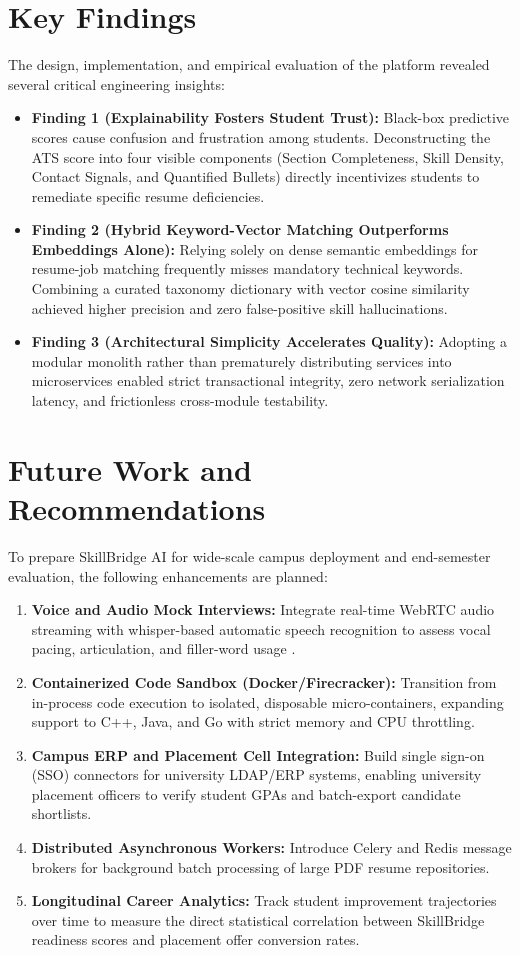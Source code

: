 \documentclass[12pt,a4paper,oneside]{report}
\begin{document}
\section{Key Findings}
The design, implementation, and empirical evaluation of the platform revealed several critical engineering insights:
\begin{itemize}[leftmargin=0.8cm]
    \item \textbf{Finding 1 (Explainability Fosters Student Trust):} Black-box predictive scores cause confusion and frustration among students. Deconstructing the ATS score into four visible components (Section Completeness, Skill Density, Contact Signals, and Quantified Bullets) directly incentivizes students to remediate specific resume deficiencies.
    \item \textbf{Finding 2 (Hybrid Keyword-Vector Matching Outperforms Embeddings Alone):} Relying solely on dense semantic embeddings for resume-job matching frequently misses mandatory technical keywords. Combining a curated taxonomy dictionary with vector cosine similarity achieved higher precision and zero false-positive skill hallucinations.
    \item \textbf{Finding 3 (Architectural Simplicity Accelerates Quality):} Adopting a modular monolith rather than prematurely distributing services into microservices enabled strict transactional integrity, zero network serialization latency, and frictionless cross-module testability.
\end{itemize}

\section{Future Work and Recommendations}
To prepare SkillBridge AI for wide-scale campus deployment and end-semester evaluation, the following enhancements are planned:
\begin{enumerate}[leftmargin=0.8cm]
    \item \textbf{Voice and Audio Mock Interviews:} Integrate real-time WebRTC audio streaming with whisper-based automatic speech recognition to assess vocal pacing, articulation, and filler-word usage \cite{texbook}.
    \item \textbf{Containerized Code Sandbox (Docker/Firecracker):} Transition from in-process code execution to isolated, disposable micro-containers, expanding support to C++, Java, and Go with strict memory and CPU throttling.
    \item \textbf{Campus ERP and Placement Cell Integration:} Build single sign-on (SSO) connectors for university LDAP/ERP systems, enabling university placement officers to verify student GPAs and batch-export candidate shortlists.
    \item \textbf{Distributed Asynchronous Workers:} Introduce Celery and Redis message brokers for background batch processing of large PDF resume repositories.
    \item \textbf{Longitudinal Career Analytics:} Track student improvement trajectories over time to measure the direct statistical correlation between SkillBridge readiness scores and placement offer conversion rates.
\end{enumerate}
\end{document}

